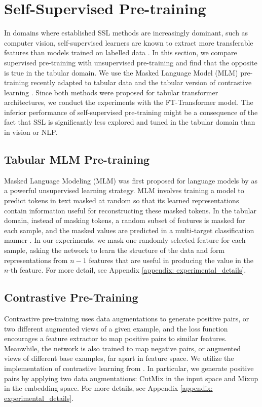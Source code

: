 \section{Self-Supervised Pre-training}\label{mainbody: self-supervised}
\label{sec:mlm}
In domains where established SSL methods are increasingly dominant, such as computer vision, self-supervised learners are known to extract more transferable features than models trained on labelled data \citep{he2020momentum, he2021masked}. In this section, we compare supervised pre-training with unsupervised pre-training and find that the opposite is true in the tabular domain. We use the Masked Language Model (MLM) pre-training recently adapted to tabular data \citep{huang2020tabtransformer} and the tabular version of contrastive learning \citep{somepalli2021saint}. Since both methods were proposed for tabular transformer architectures, we conduct the experiments with the FT-Transformer model.  The inferior performance of self-supervised pre-training might be a consequence of the fact that SSL is significantly less explored and tuned in the tabular domain than in vision or NLP.

\subsection{Tabular MLM Pre-training}

Masked Language Modeling (MLM) was first proposed for language models by \citet{devlin2019bert} as a powerful unsupervised learning strategy. MLM involves training a model to predict tokens in text masked at random so that its learned representations contain information useful for reconstructing these masked tokens. In the tabular domain, instead of masking tokens, a random subset of features is masked for each sample, and the masked values are predicted in a multi-target classification manner \citep{huang2020tabtransformer}. In our experiments, we mask one randomly selected feature for each sample, asking the network to learn the structure of the data and form representations from $n-1$ features that are useful in producing the value in the $n$-th feature. For more detail, see Appendix \ref{appendix: experimental_details}. 

\subsection{Contrastive Pre-Training}

Contrastive pre-training uses data augmentations to generate positive pairs, or two different augmented views of a given example, and the loss function encourages a feature extractor to map positive pairs to similar features. Meanwhile, the network is also trained to map negative pairs, or augmented views of different base examples, far apart in feature space. We utilize the implementation of contrastive learning from \citet{somepalli2021saint}. In particular, we generate positive pairs by applying two data augmentations: CutMix \citep{yun2019cutmix} in the input space and Mixup \citep{zhang2017mixup} in the embedding space. For more details, see Appendix \ref{appendix: experimental_details}. 

